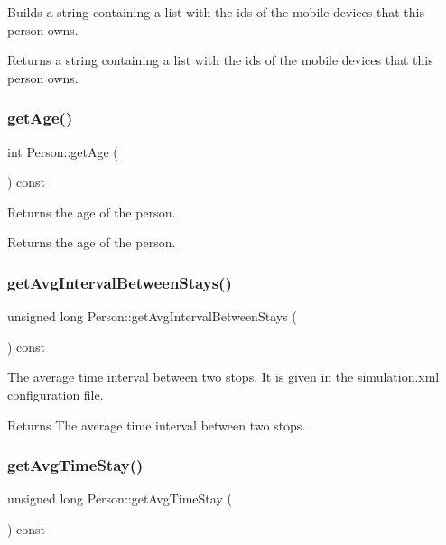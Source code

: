 Builds a string containing a list with the ids of the mobile devices that this person owns. \begin{DoxyReturn}{Returns}
a string containing a list with the ids of the mobile devices that this person owns. 
\end{DoxyReturn}
\mbox{\label{class_person_a4b66dbee570398920b8fb6aacddd2559}} 
\subsubsection{\texorpdfstring{get\+Age()}{getAge()}}
{\footnotesize\ttfamily int Person\+::get\+Age (\begin{DoxyParamCaption}{ }\end{DoxyParamCaption}) const}

Returns the age of the person. \begin{DoxyReturn}{Returns}
the age of the person. 
\end{DoxyReturn}
\mbox{\label{class_person_a59d3ea8e10928537043ee7b3d24a470c}} 
\subsubsection{\texorpdfstring{get\+Avg\+Interval\+Between\+Stays()}{getAvgIntervalBetweenStays()}}
{\footnotesize\ttfamily unsigned long Person\+::get\+Avg\+Interval\+Between\+Stays (\begin{DoxyParamCaption}{ }\end{DoxyParamCaption}) const}

The average time interval between two stops. It is given in the simulation.\+xml configuration file. \begin{DoxyReturn}{Returns}
The average time interval between two stops. 
\end{DoxyReturn}
\mbox{\label{class_person_a2b01d9997db6f6d4555dbc5ac9898077}} 
\subsubsection{\texorpdfstring{get\+Avg\+Time\+Stay()}{getAvgTimeStay()}}
{\footnotesize\ttfamily unsigned long Person\+::get\+Avg\+Time\+Stay (\begin{DoxyParamCaption}{ }\end{DoxyParamCaption}) const}

